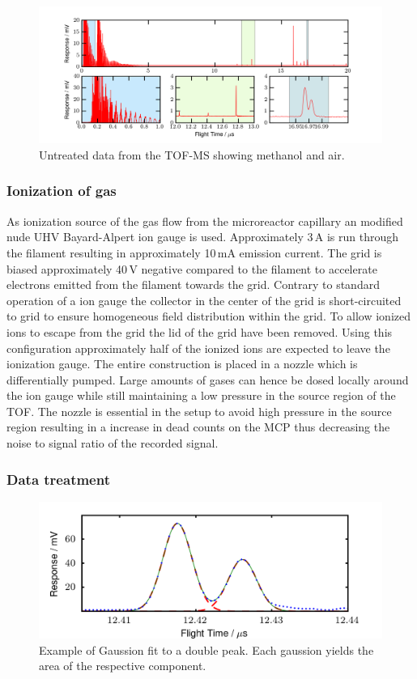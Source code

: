 \documentclass[aip,rsi]{revtex4-1}
\begin{document}
\begin{figure}
 \includegraphics[width=14cm]{untreated_data.png}%
 \caption{Untreated data from the TOF-MS showing methanol and air.\label{fig:untreated_data}}%
\end{figure}


\subsubsection{Ionization of gas}
As ionization source of the gas flow from the microreactor capillary an modified nude UHV Bayard-Alpert ion gauge is used. Approximately 3\,A is run through the filament resulting in approximately 10\,mA emission current. The grid is biased approximately 40\,V negative compared to the filament to accelerate electrons emitted from the filament towards the grid. Contrary to standard operation of a ion gauge the collector in the center of the grid is short-circuited to grid to ensure homogeneous field distribution within the grid. To allow ionized ions to escape from the grid the lid of the grid have been removed. Using this configuration approximately half of the ionized ions are expected to leave the ionization gauge. The entire construction is placed in a nozzle which is differentially pumped. Large amounts of gases can hence be dosed locally around the ion gauge while still maintaining a low pressure in the source region of the TOF. The nozzle is essential in the setup to avoid high pressure in the source region resulting in a increase in dead counts on the MCP thus decreasing the noise to signal ratio of the recorded signal.

\subsubsection{Data treatment}
\begin{figure}
 \includegraphics[width=14cm]{ammonia_OH_gauss_fit.png}%
 \caption{Example of Gaussion fit to a double peak. Each gaussion yields the area of the respective component.\label{fig:gaussian_fit}}%
\end{figure}
\end{document}
